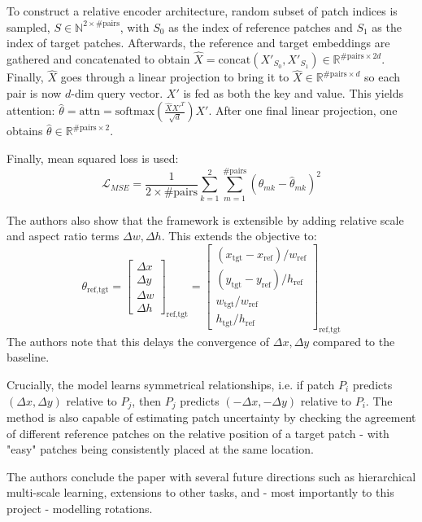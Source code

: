 \documentclass[11pt,a4paper]{report}
\begin{document}
To construct a relative encoder architecture, random subset of patch indices is sampled, $S\in\mathbb{N}^{2\times \#\text{pairs}}$, with $S_0$ as the index of reference patches and $S_1$ as the index of target patches. Afterwards, the reference and target embeddings are gathered and concatenated to obtain $\hat{X}=\text{concat}(X'_{S_0},X'_{S_1})\in\mathbb{R}^{\#\text{pairs}\times 2d}$. Finally, $\hat{X}$ goes through a linear projection to bring it to $\hat{X}\in \mathbb{R}^{\#\text{pairs}\times d}$ so each pair is now $d$-dim query vector. $X'$ is fed as both the key and value. This yields attention: $\hat{\theta}=\text{attn}=\text{softmax}(\frac{\hat{X}X'^T}{\sqrt{d}})X'$. After one final linear projection, one obtains $\hat{\theta}\in\mathbb{R}^{\#\text{pairs}\times2}$.

Finally, mean squared loss is used:
$$\mathcal{L}_{MSE}=\frac{1}{2\times\#\text{pairs}}\sum^2_{k=1}\sum^{\#\text{pairs}}_{m=1}(\theta_{mk}-\hat{\theta}_{mk})^2$$

The authors also show that the framework is extensible by adding relative scale and aspect ratio terms $\Delta w,\Delta h$. This extends the objective to:
$$\theta_{\text{ref},\text{tgt}}=\begin{bmatrix} \Delta x \\ \Delta y \\ \Delta w \\ \Delta h \end{bmatrix}_{\text{ref},\text{tgt}}=\begin{bmatrix} (x_\text{tgt}-x_\text{ref})/w_{\text{ref}} \\ (y_\text{tgt}-y_\text{ref})/h_\text{ref} \\ w_\text{tgt}/w_\text{ref} \\ h_\text{tgt}/h_\text{ref} \end{bmatrix}_{\text{ref},\text{tgt}}$$
The authors note that this delays the convergence of $\Delta x,\Delta y$ compared to the baseline. 

Crucially, the model learns symmetrical relationships, i.e. if patch $P_i$ predicts $(\Delta x,\Delta y)$ relative to $P_j$, then $P_j$ predicts $(-\Delta x,-\Delta y)$ relative to $P_i$. The method is also capable of estimating patch uncertainty by checking the agreement of different reference patches on the relative position of a target patch - with "easy" patches being consistently placed at the same location.

The authors conclude the paper with several future directions such as hierarchical multi-scale learning, extensions to other tasks, and - most importantly to this project - modelling rotations.
\end{document}
